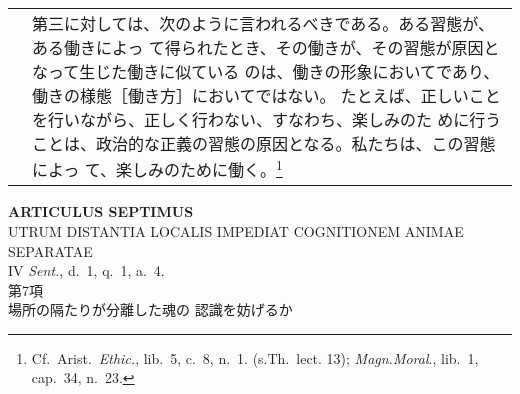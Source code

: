 \documentclass[10pt]{jsarticle} %
\begin{document}
\begin{longtable}{p{21em}p{21em}}
&

第三に対しては、次のように言われるべきである。ある習態が、ある働きによっ
て得られたとき、その働きが、その習態が原因となって生じた働きに似ている
のは、働きの形象においてであり、働きの様態［働き方］においてではない。
たとえば、正しいことを行いながら、正しく行わない、すなわち、楽しみのた
めに行うことは、政治的な正義の習態の原因となる。私たちは、この習態によっ
て、楽しみのために働く。\footnote{Cf.~Arist.~{\it Ethic.}, lib.~5,
c.~8, n.~1. (s.Th.~lect. 13); {\it Magn.Moral}., lib.~1, cap.~34,
n.~23.}


\end{longtable}

\newpage
{}

\begin{center}
{\Large {\bf ARTICULUS SEPTIMUS}}\\ {\large UTRUM DISTANTIA LOCALIS
IMPEDIAT COGNITIONEM ANIMAE SEPARATAE}\\ {\footnotesize IV {\it
Sent.}, d.~1, q.~1, a.~4.}\\ {\Large 第7項\\場所の隔たりが分離した魂の
認識を妨げるか}
\end{center}
\end{document}
